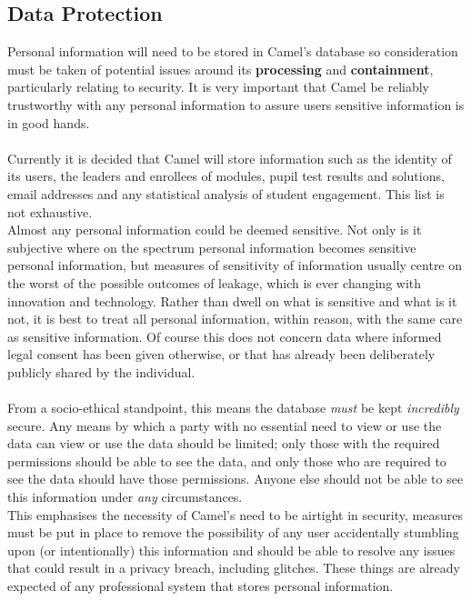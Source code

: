\subsection*{Data Protection}
Personal information will need to be stored in Camel's database so consideration must be taken of potential issues around its \textbf{processing} and \textbf{containment}, particularly relating to security. It is very important that Camel be reliably trustworthy with any personal information to assure users sensitive information is in good hands.\\\\
Currently it is decided that Camel will store information such as the identity of its users, the leaders and enrollees of modules, pupil test results and solutions, email addresses and any statistical analysis of student engagement. This list is not exhaustive.\\
Almost any personal information could be deemed sensitive. Not only is it subjective where on the spectrum personal information becomes sensitive personal information, but  measures of sensitivity of information usually centre on the worst of the possible outcomes of leakage, which is ever changing with innovation and technology. Rather than dwell on what is sensitive and what is it not, it is best to treat all personal information, within reason, with the same care as sensitive information. Of course this does not concern data where informed legal consent has been given otherwise, or that has already been deliberately publicly shared by the individual.\\\\
From a socio-ethical standpoint, this means the database \emph{must} be kept \emph{incredibly} secure. Any means by which a party with no essential need to view or use the data can view or use the data should be limited; only those with the required permissions should be able to see the data, and only those who are required to see the data should have those permissions. Anyone else should not be able to see this information under \emph{any} circumstances.
\\This emphasises the necessity of Camel’s need to be airtight in security, measures must be put in place to remove the possibility of any user accidentally stumbling upon (or intentionally) this information and should be able to resolve any issues that could result in a privacy breach, including glitches. These things are already expected of any professional system that stores personal information.\\
